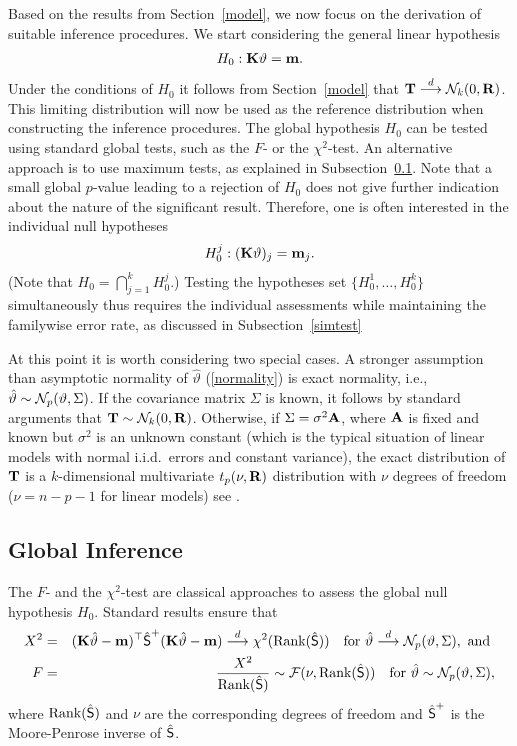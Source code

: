 \documentclass[12pt]{article}
\begin{document}
Based on the results from Section~\ref{model}, we now focus on the derivation
of suitable inference procedures. We start considering the general linear 
hypothesis \citep{Searle1971}
\begin{eqnarray*}
H_0: \K \vartheta = \m.
\end{eqnarray*}
Under the conditions of $H_0$ it follows from Section~\ref{model} that
$\T \cL \N_k(0, \Cor)$. This limiting distribution
will now be used as the reference distribution when constructing the
inference procedures.
The global hypothesis $H_0$ can be tested using standard global tests, such as
the $F$- or the $\chi^2$-test. An alternative approach is to use maximum tests, as explained
in Subsection~\ref{global}. Note that a small global $p$-value
leading to a rejection of $H_0$ does not give further indication about the nature of the
significant result. Therefore, one is often interested in the individual null hypotheses
\begin{eqnarray*}
H_0^j: (\K\vartheta)_j = \m_j.
\end{eqnarray*}
(Note that $H_0 = \bigcap_{j = 1}^k H_0^j$.) Testing the hypotheses set
$\{H_0^1, \ldots, H_0^k\}$ simultaneously thus requires the individual 
assessments while maintaining the
familywise error rate, as discussed in Subsection~\ref{simtest}

At this point it is worth
considering two special cases. A stronger assumption than asymptotic normality
of $\hat{\vartheta}$ (\ref{normality}) is exact normality, i.e.,
$\hat{\vartheta} \sim \N_p(\vartheta, \Sigma)$. If the covariance matrix $\Sigma$ is known, it
follows by standard arguments that $\T \sim \N_k(0, \Cor)$.
Otherwise, if $\Sigma = \sigma^2 \A$, where $\A$ is fixed and known
but $\sigma^2$ is an unknown constant (which is the typical situation of linear models
with normal i.i.d.~errors and constant variance), the
exact distribution of $\T$ is a $k$-dimensional multivariate
$t_p(\nu, \Cor)$
distribution with $\nu$ degrees of freedom ($\nu = n - p - 1$ for linear models) 
see \citep{Tong1990}.


\subsection{Global Inference} \label{global}

The $F$- and the $\chi^2$-test are classical approaches to assess the global null hypothesis $H_0$.
Standard results ensure that
\begin{eqnarray*}
X^2 & = & (\K \hat{\vartheta} - \m)^\top \hat{\S}^+ (\K \hat{\vartheta} - \m) \cL \chi^2(\Rg(\hat{\S}))
\quad \text{for } \hat{\vartheta} \cL \N_p(\vartheta, \Sigma), \text{ and }  \\
F & = &  \frac{X^2}{\Rg(\hat{\S})} \sim \F(\nu, \Rg(\hat{\S})) \quad \text{for }
\hat{\vartheta} \sim \N_p(\vartheta, \Sigma),
\end{eqnarray*}
where $\Rg(\hat{\S})$ and $\nu$ are the corresponding degrees of freedom and $\hat{\S}^+$
is the Moore-Penrose inverse of $\hat{\S}$.
\end{document}
